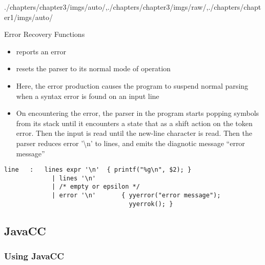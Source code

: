 \begin{graphicspathcontext}{{./chapters/chapter3/imgs/auto/},{./chapters/chapter3/imgs/raw/},{./chapters/chapter1/imgs/auto/}}
\begin{bibunit}[apalike]
\begin{frame}[fragile]{Error Recovery Functions}
	\begin{itemize}
	\item {} reports an error
	\item {} resets the parser to its normal mode of operation
	\vfill
	\item \small Here, the error production causes the program to suspend normal parsing when a syntax error is found on an input line
	\item \small On encountering the error, the parser in the program starts popping symbols from its stack until it encounters a state that as a shift action on the token error. Then the input is read until the new-line character is read. Then the parser reduces error '{\textbackslash}n' to lines, and emits the diagnotic message ``error message''
	\end{itemize}
	\begin{lstlisting}[style=lststyle-c]
	line   :   lines expr '\n'  { printf("%g\n", $2); }
	         | lines '\n'
	         | /* empty or epsilon */
	         | error '\n'       { yyerror("error message");
                                  yyerrok(); }
	\end{lstlisting}
\end{frame}

\subsection{JavaCC}
\subsectiontableofcontentslide*

\subsubsection{Using JavaCC}



\end{bibunit}
\end{graphicspathcontext}
